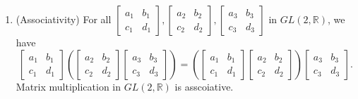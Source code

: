 \begin{solution}
\begin{enumerate}
        \item (Associativity) For all $\begin{bmatrix}
            a_1 & b_1 \\ c_1 & d_1
        \end{bmatrix}, \begin{bmatrix}
            a_2 & b_2 \\ c_2 & d_2
        \end{bmatrix}, \begin{bmatrix}
            a_3 & b_3 \\ c_3 & d_3
        \end{bmatrix}$ in $GL(2, \mathbb{R})$, we have
        \[
            \begin{bmatrix}
                a_1 & b_1 \\ c_1 & d_1
            \end{bmatrix} \left( \begin{bmatrix}
                a_2 & b_2 \\ c_2 & d_2
            \end{bmatrix} \begin{bmatrix}
                a_3 & b_3 \\ c_3 & d_3
            \end{bmatrix} \right)
            = 
            \left( \begin{bmatrix}
                a_1 & b_1 \\ c_1 & d_1
            \end{bmatrix}  \begin{bmatrix}
                a_2 & b_2 \\ c_2 & d_2
            \end{bmatrix} \right) \begin{bmatrix}
                a_3 & b_3 \\ c_3 & d_3
            \end{bmatrix}.
        \]
        Matrix multiplication in $GL(2, \mathbb{R})$ is asscoiative.


\end{enumerate}
\end{solution}
